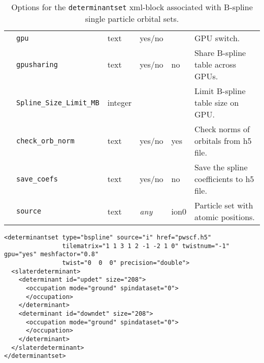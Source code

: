 \begin{table}[h]
\begin{center}
\begin{tabularx}{\textwidth}{l l l l l X }
   &   \texttt{gpu}                     &  text              &  yes/no          &                   &  GPU switch. \\
   &   \texttt{gpusharing}              &  text              &  yes/no          & no                &  Share B-spline table across GPUs. \\
   &   \texttt{Spline\_Size\_Limit\_MB} &  integer           &                  &                   &  Limit B-spline table size on GPU. \\
   &   \texttt{check\_orb\_norm}        &  text              &  yes/no          & yes               &  Check norms of orbitals from h5 file. \\
   &   \texttt{save\_coefs}             &  text              &  yes/no          & no                &  Save the spline coefficients to h5 file. \\
   &   \texttt{source}                  &  text              &  \textit{any}    & ion0              &  Particle set with atomic positions. \\
  \hline
\end{tabularx}
\end{center}
\caption{Options for the \texttt{determinantset} xml-block associated with B-spline single particle orbital sets.}
\label{table:splineSPOs}
\end{table}


\begin{lstlisting}[style=QMCPXML,caption=Determinant set XML element.\label{listing:splineSPOs}]
<determinantset type="bspline" source="i" href="pwscf.h5"
                tilematrix="1 1 3 1 2 -1 -2 1 0" twistnum="-1" gpu="yes" meshfactor="0.8"
                twist="0  0  0" precision="double">
  <slaterdeterminant>
    <determinant id="updet" size="208">
      <occupation mode="ground" spindataset="0">
      </occupation>
    </determinant>
    <determinant id="downdet" size="208">
      <occupation mode="ground" spindataset="0">
      </occupation>
    </determinant>
  </slaterdeterminant>
</determinantset>
\end{lstlisting}

